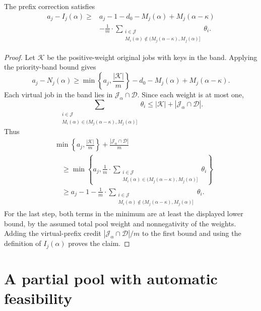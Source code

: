 \begin{proposition}
\label{prop:virtual-pool-transfer}
The prefix correction satisfies
\[
\begin{aligned}
 a_j-I_j(\alpha)\ge{}&
 a_j-1-d_0-M_j(\alpha)+M_j(\alpha-\kappa)\\
 &-\frac1m\cdot\sum_{\substack{i\in\mathcal J\\
 M_i(\alpha)\notin(M_j(\alpha-\kappa),M_j(\alpha)]}}\theta_i.
\end{aligned}
\]
\end{proposition}
\begin{proof}
Let $\mathcal K$ be the positive-weight original jobs with keys in the
band. Applying the priority-band bound gives
\[
 a_j-N_j(\alpha)\ge
 \min\left\{a_j,\frac{|\mathcal K|}{m}\right\}
 -d_0-M_j(\alpha)+M_j(\alpha-\kappa).
\]
Each virtual job in the band lies in $\mathcal J_\alpha\cap\mathcal D$.
Since each weight is at most one,
\[
 \sum_{\substack{i\in\mathcal J\\
 M_i(\alpha)\in(M_j(\alpha-\kappa),M_j(\alpha)]}}\theta_i
 \le |\mathcal K|+|\mathcal J_\alpha\cap\mathcal D|.
\]
Thus
\begin{align*}
 &\min\left\{a_j,\frac{|\mathcal K|}{m}\right\}
 +\frac{|\mathcal J_\alpha\cap\mathcal D|}{m}\\
 &\quad\ge\min\left\{a_j,\frac1m\cdot\sum_{\substack{i\in\mathcal J\\
 M_i(\alpha)\in(M_j(\alpha-\kappa),M_j(\alpha)]}}\theta_i\right\}\\
 &\quad\ge a_j-1-\frac1m\cdot\sum_{\substack{i\in\mathcal J\\
 M_i(\alpha)\notin(M_j(\alpha-\kappa),M_j(\alpha)]}}\theta_i.
\end{align*}
For the last step, both terms in the minimum are at least the displayed
lower bound, by the assumed total pool weight and nonnegativity of the weights.
Adding the virtual-prefix credit $|\mathcal J_\alpha\cap\mathcal D|/m$ to
the first bound and using the definition of $I_j(\alpha)$ proves the claim.
\end{proof}
\section{A partial pool with automatic feasibility}
\label{sec:meta-pool}

